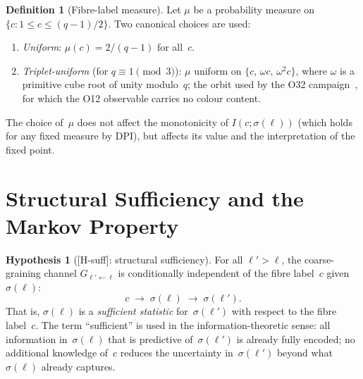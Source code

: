 \documentclass[11pt,a4paper]{article}
\theoremstyle{plain}
\theoremstyle{definition}
\newtheorem{definition}[theorem]{Definition}
\newtheorem{hypothesis}[theorem]{Hypothesis}
\theoremstyle{remark}
\begin{document}
    \begin{definition}[Fibre-label measure]
      \label{def:measure}
      Let $\mu$ be a probability measure on $\{c : 1 \le c \le (q-1)/2\}$.
      Two canonical choices are used:
      \begin{enumerate}[label=(\roman*)]
\item \emph{Uniform}: $\mu(c) = 2/(q-1)$ for all~$c$.
\item \emph{Triplet-uniform} (for $q \equiv 1 \pmod{3}$):
$\mu$ uniform on $\{c,\,\omega c,\,\omega^2 c\}$,
where $\omega$ is a primitive cube root of unity modulo~$q$;
the orbit used by the O32 campaign~\cite{Beau2026a36}, for which the O12 observable carries
no colour content.
      \end{enumerate}
    \end{definition}

    The choice of~$\mu$ does not affect the monotonicity of $I(c;\sigma(\ell))$
    (which holds for any fixed measure by DPI),
    but affects its value and the interpretation of the fixed point.

  \section{Structural Sufficiency and the Markov Property}
  \label{sec:suff}

  \begin{hypothesis}[\textup{[H-suff]}: structural sufficiency]
    \label{hyp:suff}
    For all $\ell' > \ell$, the coarse-graining channel $G_{\ell' \leftarrow \ell}$
    is conditionally independent of the fibre label~$c$ given $\sigma(\ell)$:
    \begin{equation}
      \label{eq:markov}
      c \;\longrightarrow\; \sigma(\ell) \;\longrightarrow\; \sigma(\ell').
    \end{equation}
    That is, $\sigma(\ell)$ is a \emph{sufficient statistic} for~$\sigma(\ell')$
    with respect to the fibre label~$c$.
    The term ``sufficient'' is used in the information-theoretic sense:
    all information in~$\sigma(\ell)$ that is predictive of~$\sigma(\ell')$
    is already fully encoded; no additional knowledge of~$c$ reduces
    the uncertainty in~$\sigma(\ell')$ beyond what $\sigma(\ell)$ already captures.
  \end{hypothesis}
\end{document}
